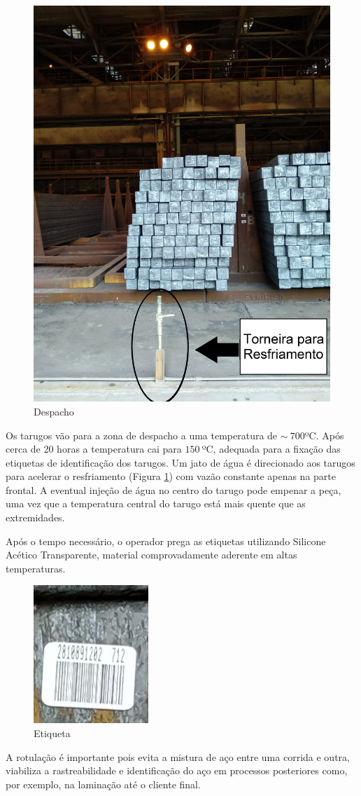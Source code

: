 \begin{figure}[htbp]
	\centering
	\includegraphics[width=0.5\linewidth]{figuras/Steel/despacho.jpg}
	\caption{Despacho}
	\label{fig:despacho}
\end{figure}

Os tarugos vão para a zona de despacho a uma temperatura de $\sim~700$ºC.
%
Após cerca de 20 horas a temperatura cai para $150~$ºC, adequada para a fixação das etiquetas de identificação dos tarugos.
%
Um jato de água é direcionado aos tarugos para acelerar o resfriamento (Figura \ref{fig:despacho}) com vazão constante apenas na parte frontal.
%
A eventual injeção de água no centro do tarugo pode empenar a peça, uma vez que a temperatura central do tarugo está mais quente que as extremidades.


Após o tempo necessário, o operador prega as etiquetas utilizando Silicone Acético Transparente, material comprovadamente aderente em altas temperaturas.


\begin{figure}[htbp]
	\centering
	\includegraphics[width=0.25\linewidth]{figuras/Steel/barcode.jpg}
	\caption{Etiqueta}
	\label{fig:barcode}
\end{figure}

A rotulação é importante pois evita a mistura de aço entre uma corrida e outra, viabiliza a rastreabilidade e identificação do aço em processos posteriores como, por exemplo, na laminação até o cliente final. 

